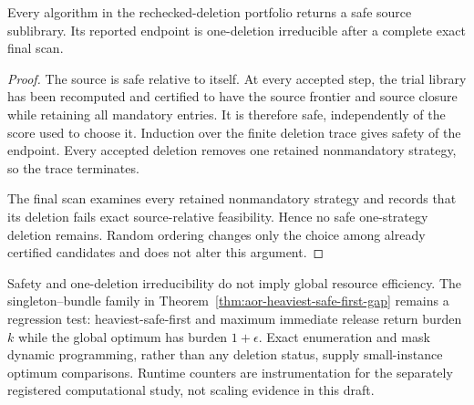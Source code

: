 \begin{proposition}
\label{prop:aor-certified-deletion-endpoint}
Every algorithm in the rechecked-deletion portfolio returns a safe source
sublibrary.  Its reported endpoint is one-deletion irreducible after a
complete exact final scan.
\end{proposition}

\begin{proof}
The source is safe relative to itself.  At every accepted step, the trial
library has been recomputed and certified to have the source frontier and
source closure while retaining all mandatory entries.  It is therefore safe,
independently of the score used to choose it.  Induction over the finite
deletion trace gives safety of the endpoint.  Every accepted deletion removes
one retained nonmandatory strategy, so the trace terminates.

The final scan examines every retained nonmandatory strategy and records that
its deletion fails exact source-relative feasibility.  Hence no safe
one-strategy deletion remains.  Random ordering changes only the choice among
already certified candidates and does not alter this argument.
\end{proof}

Safety and one-deletion irreducibility do not imply global resource
efficiency.  The singleton--bundle family in
Theorem~\ref{thm:aor-heaviest-safe-first-gap} remains a regression test:
heaviest-safe-first and maximum immediate release return burden $k$ while the
global optimum has burden $1+\epsilon$.  Exact enumeration and mask dynamic
programming, rather than any deletion status, supply small-instance optimum
comparisons.  Runtime counters are instrumentation for the separately
registered computational study, not scaling evidence in this draft.
